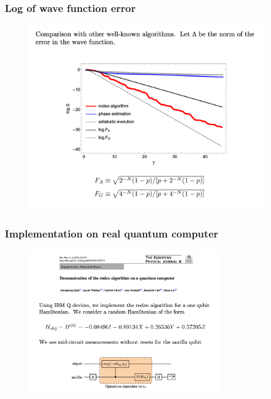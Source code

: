 \documentclass{beamer}
\begin{document}
\begin{frame}
\frametitle{Log of wave function error}
\begin{figure}
\centering
\includegraphics[width=10.5cm]{rodeofigs/rodeo7.png}
\label{Heisenberg_spectrum}
\end{figure} 

\end{frame}


\begin{frame}
\frametitle{Implementation on real quantum computer}
\begin{figure}
\centering
\includegraphics[width=8.5cm]{rodeofigs/rodeo9.png}
\label{Heisenberg_spectrum}
\end{figure} 

\end{frame}
\end{document}
